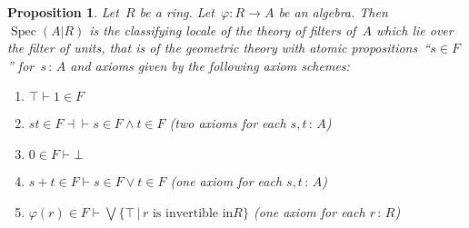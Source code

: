 \documentclass[10pt,reqno,a4paper]{amsbook}
\theoremstyle{definition}
\theoremstyle{plain}
\newtheorem{prop}[defn]{Proposition}
\theoremstyle{remark}
\DeclareMathOperator{\Spec}{Spec}
\newcommand{\?}{\,{:}\,}
\renewcommand{\_}{\mathpunct{.}\,}
\begin{document}
\begin{prop}\label{prop:local-spectrum-classify}
Let~$R$ be a ring. Let~$\varphi : R \to A$ be an algebra. Then~$\Spec(A|R)$ is
the classifying locale of the theory of filters of~$A$ which lie over the
filter of units, that is of the geometric theory with atomic propositions~``$s
\in F$'' for~$s\?A$ and axioms given by the following axiom schemes:
\begin{enumerate}
\item $\top \vdash 1 \in F$
\item $st \in F \dashv\vdash s \in F \wedge t \in F$ (two axioms for each $s,t\?A$)
\item $0 \in F \vdash \bot$
\item $s+t \in F \vdash s \in F \vee t \in F$ (one axiom for each $s,t\?A$)
\item $\varphi(r) \in F \vdash \bigvee \{ \top \,|\, \text{$r$ is invertible in
$R$} \}$ (one axiom for each $r\?R$)
\end{enumerate}
\end{prop}
\end{document}
